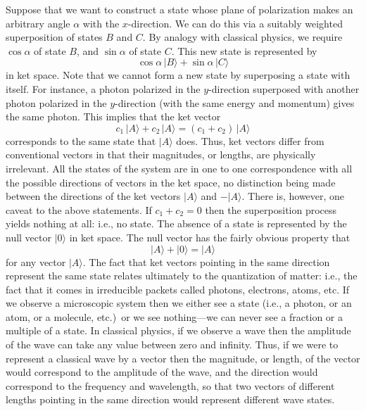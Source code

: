Suppose that we want to construct a state whose plane of polarization makes
an arbitrary angle  $\alpha$ with  the $x$-direction. We can do this 
via a suitably weighted superposition of states $B$ and $C$. By analogy
with classical physics, we require $\cos\alpha$ of state $B$, and $\sin\alpha$
of state $C$. This new state is represented by
\begin{equation}\label{e2.3}
\cos\alpha\,|B\rangle + \sin\alpha\,|C\rangle
\end{equation}
in ket space. Note that we cannot form a new state by superposing a state
with itself. For instance, a photon polarized in the $y$-direction 
superposed with another photon polarized in the $y$-direction (with the
same energy and momentum) gives 
the same  photon. This implies
that the ket vector
\begin{equation}
c_1\, |A\rangle + c_2\, |A\rangle = (c_1 + c_2)\, |A\rangle 
\end{equation}
corresponds to the same state that $|A\rangle$ does. Thus, ket vectors differ
from conventional vectors in that  their magnitudes, or lengths, are physically
irrelevant. All the states of the system are in one to one correspondence
with all the possible directions of vectors in the ket space, no distinction
being made between the directions of the ket vectors $|A\rangle$ and $-|A\rangle$.
There is, however, one caveat to the above statements. If $c_1+c_2 = 0$ then the
superposition process yields nothing at all: {\rm i.e.}, no state. The absence of
a state is represented by the null vector $|0\rangle$ in ket space. The null vector
has the fairly obvious property that
\begin{equation}
|A\rangle + |0\rangle = |A\rangle 
\end{equation}
for any vector $|A\rangle$. The fact that ket vectors pointing in the same direction
represent the same state relates ultimately to the quantization of  matter: {\rm i.e.},
the fact that it comes in irreducible packets called photons, electrons, atoms,
{\rm etc.}
If we observe a microscopic   system then we either see a state 
({\rm i.e.}, a photon, or an atom, or a molecule, {\rm  etc}.)\ or we see nothing---we can never see
a fraction or a multiple 
of a state. In classical physics, if we observe a wave then the amplitude
of the wave can take any value between zero and infinity. Thus, if we were to
 represent a classical wave by a vector then the magnitude, or length, of the 
vector would correspond to the amplitude of the wave, and the direction
would correspond to the frequency and wavelength, 
 so that two vectors 
of different lengths pointing
in the same direction would represent different wave states. 

